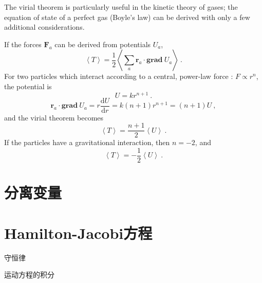 \documentclass[11pt,a4paper]{article}
\renewcommand{\vec}[1]{\boldsymbol{#1}}
\newcommand{\dif}{\mathrm{d}}
\newcounter{theo}[section]\setcounter{theo}{0}
\begin{document}
The virial theorem is particularly useful in the kinetic theory of gases; the equation of state of a perfect gas (Boyle's law) can be derived with only a few additional considerations.

If the forces $\vec{F}_a$ can be derived from potentials $U_a$, 
\begin{equation}
\left\langle T \right\rangle = \dfrac{1}{2} \left\langle \sum_a  \vec{r}_a \cdot \textbf{grad} ~U_a \right\rangle ~.
\end{equation}
For two particles which interact according to a central, power-law force : $F \propto r^n$, the potential is
\begin{equation}
U = k r^{n+1} ~.
\end{equation}
\begin{equation}
\vec{r}_a \cdot \textbf{grad} ~U_a = r \dfrac{\dif U}{\dif r} = k (n+1) r^{n+1} = (n+1) U ~,
\end{equation}
and the virial theorem becomes
\begin{equation}
\left\langle T \right\rangle = \dfrac{n+1}{2} \left\langle U \right\rangle ~.
\end{equation}
If the particles have a gravitational interaction, then $n = -2$, and
\begin{equation}
\left\langle T \right\rangle = -\dfrac{1}{2} \left\langle U \right\rangle ~.
\end{equation}













\section{分离变量}


\section{Hamilton-Jacobi方程}

守恒律

运动方程的积分
\end{document}
